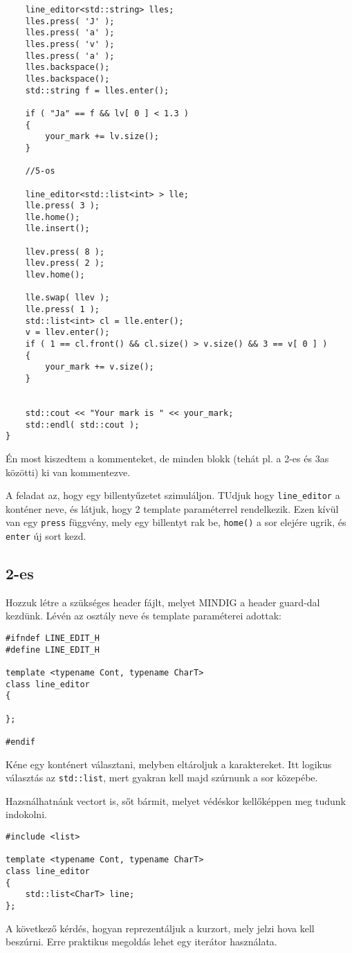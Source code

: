 \documentclass[a4paper,11.5pt,table]{article}
\begin{document}
\begin{lstlisting}
	line_editor<std::string> lles;
	lles.press( 'J' );
	lles.press( 'a' );
	lles.press( 'v' );
	lles.press( 'a' );
	lles.backspace();
	lles.backspace();
	std::string f = lles.enter();
	
	if ( "Ja" == f && lv[ 0 ] < 1.3 )
	{
		your_mark += lv.size();
	}
	
	//5-os
	
	line_editor<std::list<int> > lle;
	lle.press( 3 );
	lle.home();
	lle.insert();
	
	llev.press( 8 );
	llev.press( 2 );
	llev.home();
	
	lle.swap( llev );
	lle.press( 1 );
	std::list<int> cl = lle.enter();
	v = llev.enter();
	if ( 1 == cl.front() && cl.size() > v.size() && 3 == v[ 0 ] )
	{
		your_mark += v.size();
	}
	
	
	std::cout << "Your mark is " << your_mark;
	std::endl( std::cout );
}
\end{lstlisting}

	Én most kiszedtem a kommenteket, de minden blokk (tehát pl. a 2-es és 3as közötti) ki van kommentezve.
	
	A feladat az, hogy egy billentyűzetet szimuláljon. TUdjuk hogy \texttt{line\_editor} a konténer neve, és látjuk, hogy 2 template paraméterrel rendelkezik. Ezen kívül van egy \texttt{press} függvény, mely egy billentyt rak be, \texttt{home()} a sor elejére ugrik, és \texttt{enter} új sort kezd.
	\subsection{2-es}
	Hozzuk létre a szükséges header fájlt, melyet MINDIG a header guard-dal kezdünk. Lévén az osztály neve és template paraméterei adottak:
	\begin{lstlisting}
#ifndef LINE_EDIT_H
#define LINE_EDIT_H

template <typename Cont, typename CharT>
class line_editor
{

};

#endif 
	\end{lstlisting}
	Kéne egy konténert választani, melyben eltároljuk a karaktereket. Itt logikus választás az \texttt{std::list}, mert gyakran kell majd szúrnunk a sor közepébe.
	\begin{note}
		Hazsnálhatnánk vectort is, sőt bármit, melyet védéskor kellőképpen meg tudunk indokolni.
	\end{note}
\begin{lstlisting}
#include <list>

template <typename Cont, typename CharT>
class line_editor
{
	std::list<CharT> line;
};
\end{lstlisting}
	A következő kérdés, hogyan reprezentáljuk a kurzort, mely jelzi hova kell beszúrni. Erre praktikus megoldás lehet egy iterátor használata.
\end{document}
